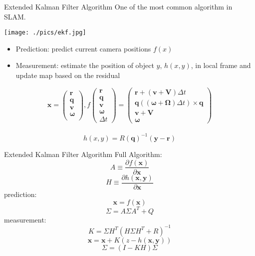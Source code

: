 \documentclass{beamer}
\begin{document}
	\begin{frame}{Extended Kalman Filter Algorithm}
		One of the most common algorithm in SLAM.\\
		\uncover<2->
		{
			\begin{center}
				\texttt{[image: ./pics/ekf.jpg]} 
			\end{center}
			\begin{itemize}
				\item Prediction: predict current camera positions \alert{$f(x)$}
				\item Measurement: estimate the position of object $y$, \alert{$h(x,y)$}, in local frame and update map based on the residual
			\end{itemize}
		}
		{
			\[
			\mathbf{x} = \left( 
			\begin{array}{c} 
				\mathbf{r}\\
				\mathbf{q}\\
				\mathbf{v}\\
				\mathbf{\omega}\\
			\end{array}
			\right),  
			f\left( 
			\begin{array}{c} 
				\mathbf{r}\\
				\mathbf{q}\\
				\mathbf{v}\\
				\mathbf{\omega}\\
				\Delta t
			\end{array} 
			\right) = 
			\left( 
			\begin{array}{c}
				\mathbf{r} + (\mathbf{v}+\mathbf{V})\Delta t\\
				\mathbf{q}((\mathbf{\omega}+\mathbf{\Omega})\Delta t) \times \mathbf{q}\\
				\mathbf{v} + \mathbf{V}\\
				\mathbf{\omega} 
			\end{array} 
			\right)
			\] \\

			\[ h(x,y) = R(\mathbf{q})^{-1}( \mathbf{y}-\mathbf{r} ) \]
		}
	\end{frame}

	\begin{frame}{Extended Kalman Filter Algorithm}
		Full Algorithm: \\
		\[ A \equiv \frac{ \partial f(\mathbf{x}) }{ \partial \mathbf{x} } \]
		\[ H \equiv \frac{ \partial h(\mathbf{x},\mathbf{y}) }{ \partial \mathbf{x} } \]
		prediction:\\
		\[\mathbf{x} = f(\mathbf{x})\]
		\[\Sigma = A\Sigma A^{T} + Q\]
		measurement:\\
		\[K = \Sigma H^{T}(H\Sigma H^{T}+R)^{-1}\]
		\[\mathbf{x} = \mathbf{x}+K(z-h(\mathbf{x},\mathbf{y}))\]
		\[\Sigma = (I-KH)\Sigma\]

	\end{frame}
\end{document}

